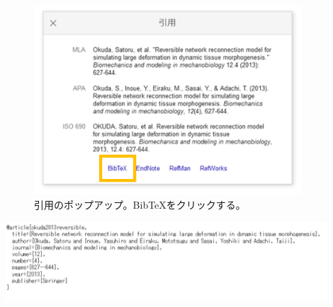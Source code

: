 \begin{figure}[htbp]
	\centering
	\includegraphics[width=10cm,clip]{fig/quote.png}
	\caption{引用のポップアップ。BibTeXをクリックする。}
	\label{fig:quote}
\end{figure}

\begin{clearpagefigure}%
	\includegraphics[width=12cm,clip]{fig/bibtex.png}
	\caption{BibTeX. これを.bibファイルにコピペする。}
	\label{fig:bibtex}
\end{clearpagefigure}
